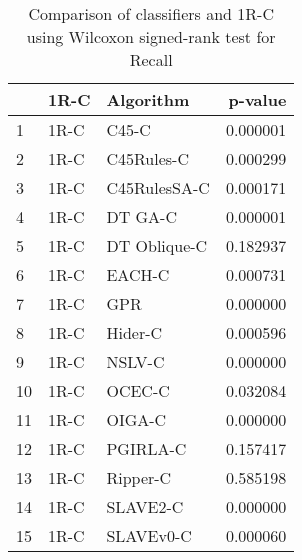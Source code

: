 \begin{table}
\footnotesize
\caption{Comparison of classifiers and 1R-C using Wilcoxon signed-rank test for Recall}
\label{tab:1R-C wilcoxon Recall comparison}
\begin{tabular}{lllr}
\hline
 & 1R-C & Algorithm & p-value \\
\hline
1 & 1R-C & C45-C & 0.000001 \\
2 & 1R-C & C45Rules-C & 0.000299 \\
3 & 1R-C & C45RulesSA-C & 0.000171 \\
4 & 1R-C & DT GA-C & 0.000001 \\
5 & 1R-C & DT Oblique-C & 0.182937 \\
6 & 1R-C & EACH-C & 0.000731 \\
7 & 1R-C & GPR & 0.000000 \\
8 & 1R-C & Hider-C & 0.000596 \\
9 & 1R-C & NSLV-C & 0.000000 \\
10 & 1R-C & OCEC-C & 0.032084 \\
11 & 1R-C & OIGA-C & 0.000000 \\
12 & 1R-C & PGIRLA-C & 0.157417 \\
13 & 1R-C & Ripper-C & 0.585198 \\
14 & 1R-C & SLAVE2-C & 0.000000 \\
15 & 1R-C & SLAVEv0-C & 0.000060 \\
\hline
\end{tabular}
\end{table}
